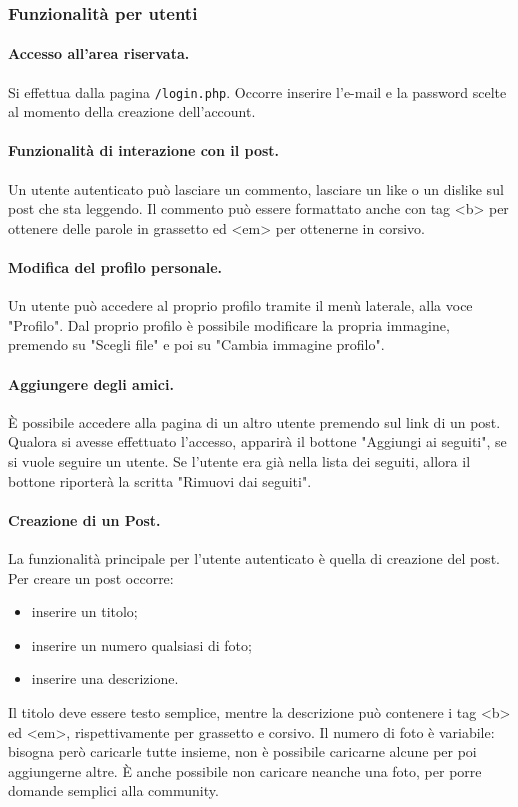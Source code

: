 \documentclass[12pt, a4paper]{article}
\begin{document}
    \subsubsection{Funzionalità per utenti}

    \paragraph{Accesso all'area riservata.}
    Si effettua dalla pagina \texttt{/login.php}. Occorre inserire l'e-mail e la password scelte al momento della creazione dell'account.

    \paragraph{Funzionalità di interazione con il post.} Un utente autenticato può lasciare un commento, lasciare un like o un dislike sul post che sta leggendo. Il commento può essere formattato anche con tag <b> per ottenere delle parole in grassetto ed <em> per ottenerne in corsivo.

    \paragraph{Modifica del profilo personale.}
    Un utente può accedere al proprio profilo tramite il menù laterale, alla voce "Profilo". Dal proprio profilo è possibile modificare la propria immagine, premendo su "Scegli file" e poi su "Cambia immagine profilo".

    \paragraph{Aggiungere degli amici.} È possibile accedere alla pagina di un altro utente premendo sul link di un post. Qualora si avesse effettuato l'accesso, apparirà il bottone "Aggiungi ai seguiti", se si vuole seguire un utente. Se l'utente era già nella lista dei seguiti, allora il bottone riporterà la scritta "Rimuovi dai seguiti".

    \paragraph{Creazione di un Post.} La funzionalità principale per l'utente autenticato è quella di creazione del post. Per creare un post occorre:
    \begin{itemize}
        \item inserire un titolo;
        \item inserire un numero qualsiasi di foto;
        \item inserire una descrizione.
    \end{itemize}
    Il titolo deve essere testo semplice, mentre la descrizione può contenere i tag <b> ed <em>, rispettivamente per grassetto e corsivo. Il numero di foto è variabile: bisogna però caricarle tutte insieme, non è possibile caricarne alcune per poi aggiungerne altre. È anche possibile non caricare neanche una foto, per porre domande semplici alla community.
\end{document}
